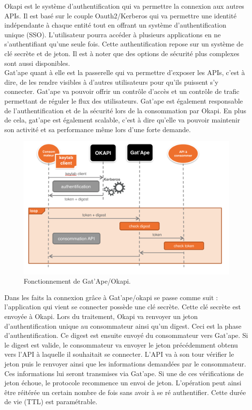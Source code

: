 Okapi est le système d'authentification qui va permettre la connexion aux autres APIs. Il est basé sur le couple Oauth2/Kerberos qui va permettre une identité indépendante à chaque entité tout en offrant un système d'authentification unique (SSO). L'utilisateur pourra accéder à plusieurs applications en ne s'authentifiant qu'une seule fois. Cette authentification repose sur un système de clé secrète et de jeton. Il est à noter que des options de sécurité plus complexes sont aussi disponibles.\\

Gat'ape quant à elle est la passerelle qui va permettre d'exposer les APIs, c'est à dire, de les rendre visibles à d'autres utilisateurs pour qu'ils puissent s'y connecter. Gat'ape va pouvoir offrir un contrôle d'accès et un contrôle de trafic permettant de réguler le flux des utilisateurs. Gat'ape est également responsable  de l'authentification et de la sécurité lors de la consommation par Okapi. En plus de cela, gat'ape est également scalable, c'est à dire qu'elle va pouvoir maintenir son activité et sa performance même lors d'une forte demande.\\

\begin{figure}[htp]
  \centering
  \includegraphics[width=15cm]{images/gao/gao1}
  \caption{Fonctionnement de Gat'Ape/Okapi.}
  \label{gatape}
\end{figure}


Dans les faits la connexion grâce à Gat'ape/okapi se passe comme suit : 
l'application qui vient se connecter possède une clé secrète. Cette clé secrète est envoyée à Okapi. Lors du traitement, Okapi va renvoyer un jeton d'authentification unique au consommateur ainsi qu'un digest. Ceci est la phase d'authentification.  Ce digest est ensuite envoyé du consommateur vers Gat'ape. Si le digest est valide, le consommateur va envoyer le jeton précédemment obtenu vers l'API à laquelle il souhaitait se connecter. L'API va à son tour vérifier le jeton puis le renvoyer ainsi que les informations demandées par le consommateur. Ces informations lui seront transmises via Gat'ape. Si une de ces vérifications de jeton échoue, le protocole recommence un envoi de jeton. L'opération peut ainsi être réitérée un certain nombre de fois sans avoir à se ré authentifier. Cette durée de vie (TTL) est paramétrable.




